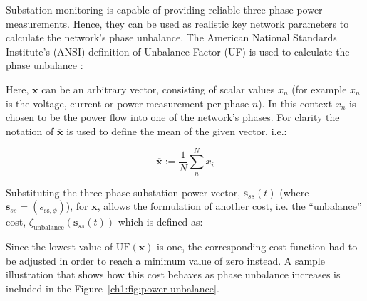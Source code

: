 
Substation monitoring is capable of providing reliable three-phase power measurements.
Hence, they can be used as realistic key network parameters to calculate the network's phase unbalance.
The American National Standards Institute's (ANSI) definition of Unbalance Factor (UF) is used to calculate the phase unbalance \cite{ANSI-MB-1-2011}:



Here, $\textbf{x}$ can be an arbitrary vector, consisting of scalar values $x_n$ (for example $x_n$ is the voltage, current or power measurement per phase $n$).
In this context $x_n$ is chosen to be the power flow into one of the network's phases.
For clarity the notation of $\overline{\textbf{x}}$ is used to define the mean of the given vector, i.e.:

\begin{equation}
	\overline{\textbf{x}} := \frac{1}{N}\sum_n^N{x_i}
\end{equation}


Substituting the three-phase substation power vector, $\textbf{s}_{ss}(t)$ (where $\textbf{s}_{ss} = (s_{\text{ss},\phi})$), for $\textbf{x}$, allows the formulation of another cost, i.e. the ``unbalance'' cost, $\zeta_\text{unbalance}(\textbf{s}_{ss}(t))$ which is defined as:



Since the lowest value of $\text{UF}(\textbf{x})$ is one, the corresponding cost function had to be adjusted in order to reach a minimum value of zero instead.
A sample illustration that shows how this cost behaves as phase unbalance increases is included in the Figure~\ref{ch1:fig:power-unbalance}.

